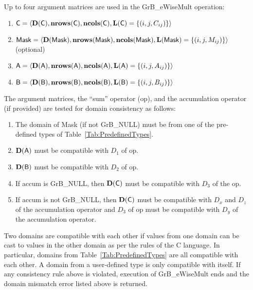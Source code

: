 Up to four argument matrices are used in the {\sf GrB\_eWiseMult} operation:
\begin{enumerate}
	\item ${\sf C} = \langle \bold{D}({\sf C}),\bold{nrows}({\sf C}),\bold{ncols}({\sf C}),\bold{L}({\sf C}) = \{(i,j,C_{ij}) \} \rangle$
	\item ${\sf Mask} = \langle \bold{D}({\sf Mask}),\bold{nrows}({\sf Mask}),\bold{ncols}({\sf Mask}),\bold{L}({\sf Mask}) = \{(i,j,M_{ij}) \} \rangle$ (optional)
	\item ${\sf A} = \langle \bold{D}({\sf A}),\bold{nrows}({\sf A}), \bold{ncols}({\sf A}),\bold{L}({\sf A}) = \{(i,j,A_{ij}) \} \rangle$
	\item ${\sf B} = \langle \bold{D}({\sf B}),\bold{nrows}({\sf B}), \bold{ncols}({\sf B}),\bold{L}({\sf B}) = \{(i,j,B_{ij}) \} \rangle$
\end{enumerate}

The argument matrices, the ``sum'' operator ({\sf op}), and the accumulation 
operator (if provided) are tested for domain consistency as follows:
\begin{enumerate}
	\item The domain of {\sf Mask} (if not {\sf GrB\_NULL}) must be from one of the pre-defined types of Table~\ref{Tab:PredefinedTypes}.

	\item $\bold{D}({\sf A})$ must be compatible with $D_1$ of {\sf op}.

	\item $\bold{D}({\sf B})$ must be compatible with $D_2$ of {\sf op}.

	\item If {\sf accum} is {\sf GrB\_NULL}, then $\bold{D}({\sf C})$ must be 
    compatible with $D_3$ of the {\sf op}.

	\item If {\sf accum} is not {\sf GrB\_NULL}, then $\bold{D}({\sf C})$ must be
    compatible with $D_x$ and $D_z$ of the accumulation operator and $D_3$ of
    {\sf op} must be compatible with $D_y$ of the accumulation operator.
\end{enumerate}
Two domains are compatible with each other if values from one domain can be cast 
to values in the other domain as per the rules of the C language.
In particular, domains from Table~\ref{Tab:PredefinedTypes} are all compatible 
with each other. A domain from a user-defined type is only compatible with itself.
If any consistency rule above is violated, execution of {\sf GrB\_eWiseMult} ends
and the domain mismatch error listed above is returned.

